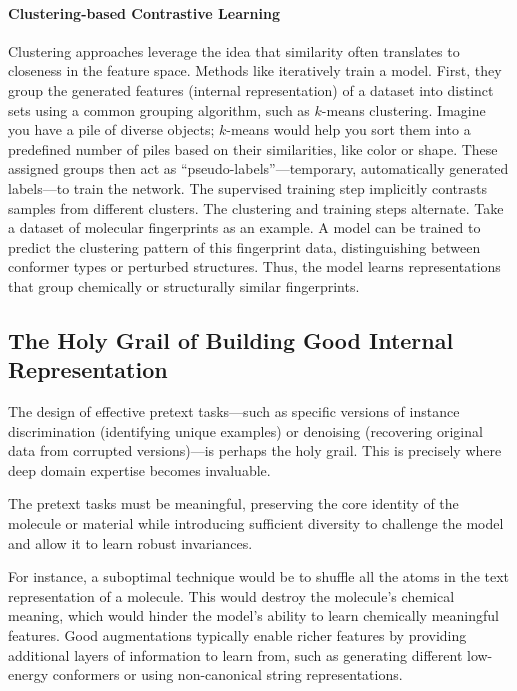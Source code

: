 \paragraph{Clustering-based Contrastive Learning} 
\label{sec:clustering_cl}
Clustering approaches leverage the idea that similarity often translates to closeness in the feature space. Methods like  \autocite{caron2018deep}  iteratively train a model. First, they group the generated features (internal representation) of a dataset into distinct sets using a common grouping algorithm, such as $k$-means clustering. Imagine you have a pile of diverse objects; $k$-means would help you sort them into a predefined number of piles based on their similarities, like color or shape. 
These assigned groups then act as \enquote{pseudo-labels}---temporary, automatically generated labels---to train the network. 
The supervised training step implicitly contrasts samples from different clusters. The clustering and training steps alternate. 
Take a dataset of molecular fingerprints as an example. A model can be trained to predict the clustering pattern of this fingerprint data, distinguishing between conformer types or perturbed structures. Thus, the model learns representations that group chemically or structurally similar fingerprints. 



\subsection{The Holy Grail of Building Good Internal Representation} 

The design of effective pretext tasks---such as specific versions of instance discrimination (identifying unique examples) or denoising (recovering original data from corrupted versions)---is perhaps the holy grail. This is precisely where deep domain expertise becomes invaluable.

The pretext tasks must be meaningful, preserving the core identity of the molecule or material while introducing sufficient diversity to challenge the model and allow it to learn robust invariances.

For instance, a suboptimal technique would be to shuffle all the atoms in the text representation of a molecule. 
This would destroy the molecule's chemical meaning, which would hinder the model's ability to learn chemically meaningful features. 
Good augmentations typically enable richer features by providing additional layers of information to learn from, such as generating different low-energy conformers or using non-canonical string representations.


